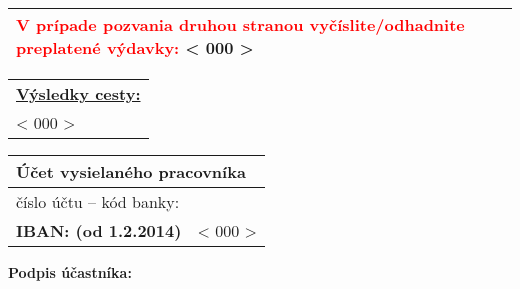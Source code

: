 \documentclass[10pt,a4paper]{article}
\newcommand{\placeholder}[1]{< #1 >}
\newcommand{\invitationCaseCharges}{\placeholder{000}}
\newcommand{\conclusion}{\placeholder{000}}
\newcommand{\iban}{\placeholder{000}}
\begin{document}
\bgroup
\def\arraystretch{1.5}
\begin{table}[h!]
\begin{tabularx}{\linewidth}{|X|}
	\hline
	\textcolor{red}{\textbf{V prípade pozvania druhou stranou vyčíslite/odhadnite preplatené výdavky:}} \invitationCaseCharges \\ \hline
\end{tabularx}
\end{table}
\egroup

\begin{table}[h!]
\begin{tabularx}{\linewidth}{|X|}
	\hline
	\textbf{\underline{Výsledky cesty:}} \\
	\conclusion
 	\vspace*{2em} \\ \hline
\end{tabularx}
\end{table}

\vspace*{-1em}

\begin{table}[h!]
\centering
\begin{tabularx}{\linewidth}{|lX|}
	\hline
	\multicolumn{2}{|l|}{\textbf{Účet vysielaného pracovníka}} \\ \hline
	\multicolumn{1}{|l|}{číslo účtu -- kód banky:} &  \\ \hline
	\multicolumn{1}{|l|}{\textbf{IBAN: (od 1.2.2014)}} & \iban \\ \hline
\end{tabularx}
\end{table}

\begin{center}
	\textbf{Podpis účastníka:}
\end{center}
\end{document}
